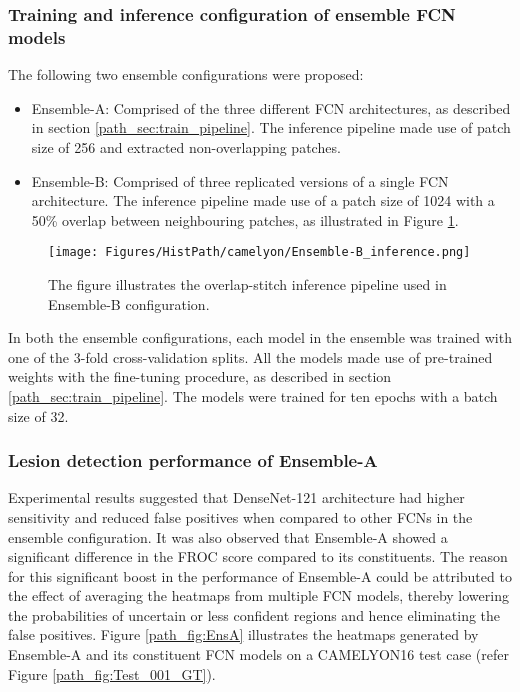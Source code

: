 \documentclass[times,twocolumn,final,authoryear]{tmp}
\begin{document}
\subsubsection{Training and inference configuration of ensemble FCN models}
\label{path_sec:ens_config}
The following two ensemble configurations were proposed:  
\begin{itemize}
    \item Ensemble-A: Comprised of the three different FCN architectures, as described in section \ref{path_sec:train_pipeline}. The inference pipeline made use of patch size of 256 and extracted non-overlapping patches.
    \item Ensemble-B: Comprised of three replicated versions of a single FCN architecture. The inference pipeline made use of a patch size of 1024 with a 50\% overlap between neighbouring patches, as illustrated in Figure \ref{path_fig:EnsB-config}.    
\end{itemize}

\begin{figure}
\texttt{[image: Figures/HistPath/camelyon/Ensemble-B\_inference.png]}
    \caption{The figure illustrates the overlap-stitch inference pipeline used in Ensemble-B configuration.}
    \label{path_fig:EnsB-config}
\end{figure}  

In both the ensemble configurations, each model in the ensemble was trained with one of the 3-fold cross-validation splits. All the models made use of pre-trained weights with the fine-tuning procedure, as described in section \ref{path_sec:train_pipeline}. The models were trained for ten epochs with a batch size of 32.

\subsubsection{Lesion detection performance of Ensemble-A}

\label{path_sec:Ens-A-perform}
Experimental results suggested that DenseNet-121 architecture had higher sensitivity and reduced false positives when compared to other FCNs in the ensemble configuration. It was also observed that Ensemble-A showed a significant difference in the FROC score compared to its constituents. The reason for this significant boost in the performance of Ensemble-A could be attributed to the effect of averaging the heatmaps from multiple FCN models, thereby lowering the probabilities of uncertain or less confident regions and hence eliminating the false positives. Figure \ref{path_fig:EnsA} illustrates the heatmaps generated by Ensemble-A and its constituent FCN models on a CAMELYON16 test case (refer Figure \ref{path_fig:Test_001_GT}). 
\end{document}
